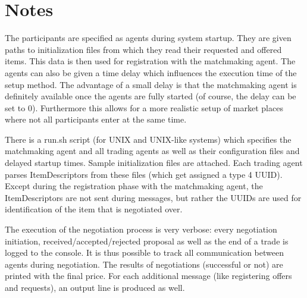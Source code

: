 \documentclass[a4paper,11pt]{article}
\begin{document}
\section{Notes}
The participants are specified as agents during system startup. They are given paths to initialization files from which they read their requested and offered items. This data is then used for registration with the matchmaking agent. The agents can also be given a time delay which influences the execution time of the setup method. The advantage of a small delay is that the matchmaking agent is definitely available once the agents are fully started (of course, the delay can be set to 0). Furthermore this allows for a more realistic setup of market places where not all participants enter at the same time.

There is a run.sh script (for UNIX and UNIX-like systems) which specifies the matchmaking agent and all trading agents as well as their configuration files and delayed startup times. Sample initialization files are attached. Each trading agent parses ItemDescriptors from these files (which get assigned a type 4 UUID). Except during the registration phase with the matchmaking agent, the ItemDescriptors are not sent during messages, but rather the UUIDs are used for identification of the item that is negotiated over.

The execution of the negotiation process is very verbose: every negotiation initiation, received/accepted/rejected proposal as well as the end of a trade is logged to the console. It is thus possible to track all communication between agents during negotiation. The results of negotiations (successful or not) are printed with the final price. For each additional message (like registering offers and requests), an output line is produced as well.
\end{document}
